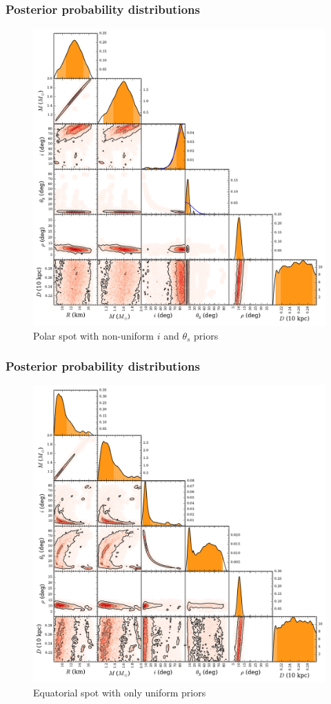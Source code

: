 \documentclass{beamer}
\def\thetas{\theta_{s}}
\begin{document}
\begin{frame}
\frametitle{Posterior probability distributions}

\begin{figure}
\includegraphics[width=0.5\linewidth]{fpolprf.pdf}
\caption{Polar spot with non-uniform $i$ and $\thetas$ priors}
\end{figure}

\end{frame}



\begin{frame}
\frametitle{Posterior probability distributions}

\begin{figure}
\includegraphics[width=0.5\linewidth]{feqf.pdf}
\caption{Equatorial spot with only uniform priors}
\end{figure}

\end{frame}

\end{document}
